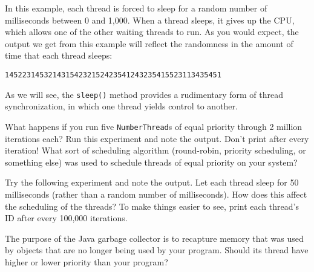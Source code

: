 \noindent In this example, each thread is forced to sleep for a random
number of milliseconds between 0 and 1,000. When a thread sleeps, it
gives up the CPU, which allows one of the other waiting threads to
run.  As you would expect, the output we get from this example will
reflect the randomness in the amount of time that each thread sleeps:

\begin{jjjlisting}
\begin{lstlisting}
14522314532143154232152423541243235415523113435451
\end{lstlisting}
\end{jjjlisting}

\noindent As we will see, the {\tt sleep()} method provides a
rudimentary form of thread synchronization, in which one thread
yields control to another.

\pagebreak
{}
\begin{SSTUDY}

\item  What happens if you run five {\tt NumberThread}s of equal priority
through 2 million iterations each? Run this experiment and note the
output.  Don't print after every iteration! What sort of scheduling
algorithm (round-robin, priority scheduling, or something else) was used
to schedule threads of equal priority on your system?

\item  Try the following experiment and note the output.   Let each thread
sleep for 50 milliseconds (rather than a random number of
milliseconds). How does this affect the scheduling of the threads? To
make things easier to see, print each thread's ID after every 100,000
iterations.

\item  The purpose of the Java garbage collector is to recapture
memory that was used by objects that are no longer being
used by your program.  Should its thread have higher or
lower priority than your program?
\end{SSTUDY}


